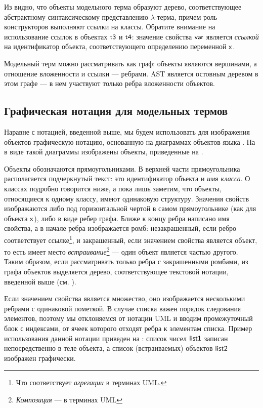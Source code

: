 Из  видно, что объекты модельного терма образуют дерево, соответствующее абстрактному синтаксическому представлению $\lambda$-терма, причем роль конструкторов выполняют ссылки на классы. Обратите внимание на использование ссылок в объектах $\mathsf{t3}$ и $\mathsf{t4}$: значение свойства $\mathsf{var}$ является \emph{ссылкой} на идентификатор объекта, соответствующего определению переменной $\mathsf{x}$. 

Модельный терм можно рассматривать как граф: объекты являются вершинами, а отношение вложенности и ссылки --- ребрами. AST является остовным деревом в этом графе --- в нем участвуют только ребра вложенности объектов.

\subsection{Графическая нотация для модельных термов}

Наравне с нотацией, введенной выше, мы будем использовать для изображения объектов графическую нотацию, основанную на диаграммах объектов языка  \cite{UML}. На  в виде такой диаграммы изображены объекты, приведенные на .


Объекты обозначаются прямоугольниками. В верхней части прямоугольника располагается подчеркнутый текст: это идентификатор объекта и \emph{имя класса}. О классах подробно говорится ниже, а пока лишь заметим, что объекты, относящиеся к одному классу, имеют одинаковую структуру. Значения свойств изображаются либо под горизонтальной чертой в самом прямоугольнике (как для объекта $\mathsf{x}$), либо в виде ребер графа. Ближе к концу ребра написано имя свойства, а в начале ребра изображается ромб: незакрашенный, если ребро соответствует ссылке\footnote{Что соответствует \emph{агрегации} в терминах UML.}, и закрашенный, если значением свойства является объект, то есть имеет место \emph{встраивание}\footnote{\emph{Композиция} --- в терминах UML} --- один объект является частью другого. Таким образом, если рассматривать только ребра с закрашенными ромбами, из графа объектов выделяется дерево, соответствующее текстовой нотации, введенной выше (см. ).


Если значением свойства является множество, оно изображается несколькими ребрами с одинаковой пометкой. В случае списка важен порядок следования элементов, поэтому мы отклоняемся от нотации UML и вводим промежуточный блок с индексами, от ячеек которого отходят ребра к элементам списка. Пример использования данной нотации приведен на : список чисел $\mathsf{list1}$ записан непосредственно в теле объекта, а список (встраиваемых) объектов $\mathsf{list2}$ изображен графически.


